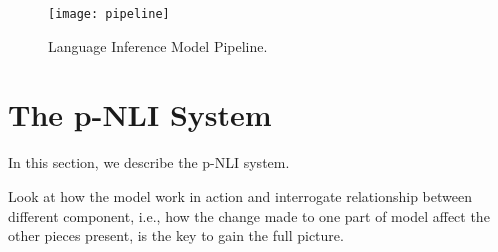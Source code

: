 \begin{figure}[htbp]
\centering
\vspace{-2mm}
 \texttt{[image: pipeline]}
 \caption{Language Inference Model Pipeline.}
\label{fig:modelPipeline}
\end{figure}

\section{The p-NLI System}
In this section, we describe the p-NLI system.

%
Look at how the model work in action and interrogate relationship between different component, i.e., how the change made to one part of model affect the other pieces present, is the key to gain the full picture.
